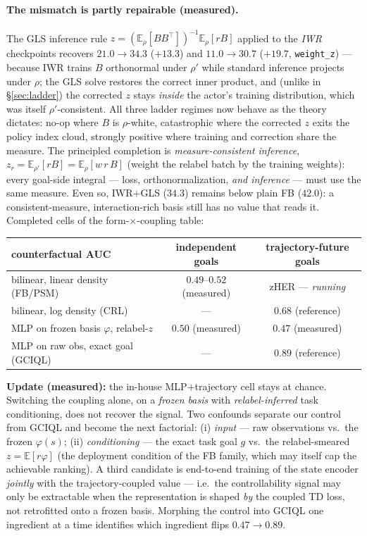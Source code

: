 \documentclass[11pt,a4paper]{article}
\newcommand{\E}{\mathbb{E}}
\begin{document}
\paragraph{The mismatch is partly repairable (measured).} The GLS inference rule
$z=(\E_{\rho}[BB^{\top}])^{-1}\E_{\rho}[rB]$ applied to the \emph{IWR} checkpoints recovers
$21.0\to34.3$ ($+13.3$) and $11.0\to30.7$ ($+19.7$, \texttt{weight\_z}) --- because IWR trains
$B$ orthonormal under $\rho'$ while standard inference projects under $\rho$; the GLS solve
restores the correct inner product, and (unlike in \S\ref{sec:ladder}) the corrected $z$ stays
\emph{inside} the actor's training distribution, which was itself $\rho'$-consistent. All three
ladder regimes now behave as the theory dictates: no-op where $B$ is $\rho$-white, catastrophic
where the corrected $z$ exits the policy index cloud, strongly positive where training and
correction share the measure. The principled completion is \emph{measure-consistent inference},
$z_r=\E_{\rho'}[rB]=\E_{\rho}[w\,r\,B]$ (weight the relabel batch by the training weights):
every goal-side integral --- loss, orthonormalization, \emph{and inference} --- must use the same
measure. Even so, IWR$+$GLS ($34.3$) remains below plain FB ($42.0$): a consistent-measure,
interaction-rich basis still has no value that reads it. Completed cells of the form-$\times$-coupling table:
\begin{center}\small
\begin{tabular}{@{}lcc@{}}
\toprule
counterfactual AUC & independent goals & trajectory-future goals\\
\midrule
bilinear, linear density (FB/PSM) & $0.49$--$0.52$ (measured) & zHER --- \emph{running}\\
bilinear, log density (CRL) & --- & $0.68$ (reference)\\
MLP on frozen basis $\varphi$, relabel-$z$ & $0.50$ (measured) & $\mathbf{0.47}$ (measured) \\
MLP on raw obs, exact goal (GCIQL) & --- & $0.89$ (reference)\\
\bottomrule
\end{tabular}
\end{center}
\textbf{Update (measured):} the in-house MLP$+$trajectory cell stays at chance. Switching the
coupling alone, on a \emph{frozen basis} with \emph{relabel-inferred} task conditioning, does not
recover the signal. Two confounds separate our control from GCIQL and become the next factorial:
(i) \emph{input} --- raw observations vs.\ the frozen $\varphi(s)$; (ii) \emph{conditioning} ---
the exact task goal $g$ vs.\ the relabel-smeared $z=\E[r\varphi]$ (the deployment condition of the
FB family, which may itself cap the achievable ranking). A third candidate is end-to-end training
of the state encoder \emph{jointly} with the trajectory-coupled value --- i.e.\ the controllability
signal may only be extractable when the representation is shaped \emph{by} the coupled TD loss,
not retrofitted onto a frozen basis. Morphing the control into GCIQL one ingredient at a time
identifies which ingredient flips $0.47\to0.89$.
\end{document}
